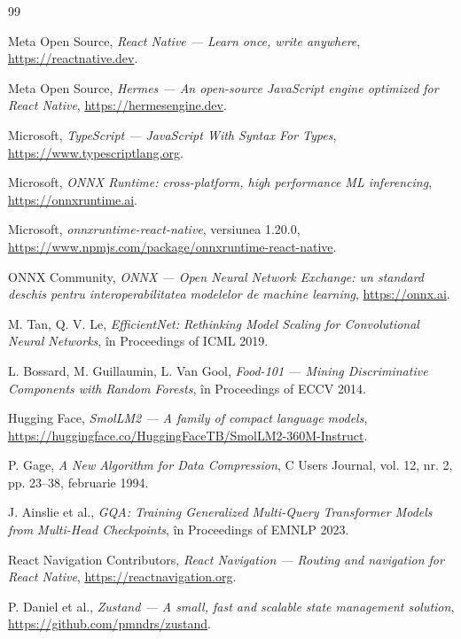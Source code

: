\documentclass[12pt, a4paper, twoside]{report}
\numberwithin{equation}{section}
\begin{document}
\begin{thebibliography}{99}

Meta Open Source, \textit{React Native --- Learn once, write anywhere},
\url{https://reactnative.dev}.

Meta Open Source, \textit{Hermes --- An open-source JavaScript engine optimized for
React Native}, \url{https://hermesengine.dev}.

Microsoft, \textit{TypeScript --- JavaScript With Syntax For Types},
\url{https://www.typescriptlang.org}.

Microsoft, \textit{ONNX Runtime: cross-platform, high performance ML inferencing},
\url{https://onnxruntime.ai}.

Microsoft, \textit{onnxruntime-react-native}, versiunea 1.20.0,
\url{https://www.npmjs.com/package/onnxruntime-react-native}.

ONNX Community, \textit{ONNX --- Open Neural Network Exchange: un standard deschis pentru
interoperabilitatea modelelor de \textit{machine learning}}, \url{https://onnx.ai}.

M. Tan, Q. V. Le, \textit{EfficientNet: Rethinking Model Scaling for Convolutional
Neural Networks}, în Proceedings of ICML 2019.

L. Bossard, M. Guillaumin, L. Van Gool,
\textit{Food-101 --- Mining Discriminative Components with Random Forests},
în Proceedings of ECCV 2014.

Hugging Face, \textit{SmolLM2 --- A family of compact language models},
\url{https://huggingface.co/HuggingFaceTB/SmolLM2-360M-Instruct}.

P. Gage, \textit{A New Algorithm for Data Compression},
C Users Journal, vol. 12, nr. 2, pp. 23--38, februarie 1994.

J. Ainslie et al., \textit{GQA: Training Generalized Multi-Query Transformer Models from
Multi-Head Checkpoints}, în Proceedings of EMNLP 2023.

React Navigation Contributors, \textit{React Navigation --- Routing and navigation for
React Native}, \url{https://reactnavigation.org}.

P. Daniel et al., \textit{Zustand --- A small, fast and scalable state management solution},
\url{https://github.com/pmndrs/zustand}.


\end{thebibliography}
\end{document}
